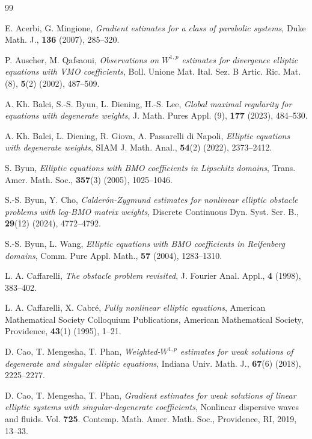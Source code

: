 \documentclass[a4paper, 11pt]{article}
\begin{document}
\begin{thebibliography}{99}

\footnotesize

  E. Acerbi, G. Mingione, {\em Gradient estimates for a class of parabolic systems}, Duke Math. J., {\bf 136} (2007), 285--320.

 P. Auscher, M. Qafsaoui, {\em Observations on $W^{1,p}$ estimates for divergence elliptic equations with VMO coefficients}, Boll. Unione Mat. Ital. Sez. B Artic. Ric. Mat. (8), {\bf 5}(2) (2002), 487--509.

 A. Kh. Balci, S.-S. Byun, L. Diening, H.-S. Lee, {\em Global maximal regularity for equations with degenerate weights}, J. Math. Pures Appl. (9), {\bf 177} (2023), 484--530.

  A. Kh. Balci, L. Diening, R. Giova, A. Passarelli di Napoli, {\em Elliptic equations with degenerate weights}, SIAM J. Math. Anal., {\bf 54}(2) (2022), 2373--2412.

 S. Byun, {\em Elliptic equations with BMO coefficients in Lipschitz domains}, Trans. Amer. Math. Soc., {\bf 357}(3) (2005), 1025--1046.

 S.-S. Byun, Y. Cho, {\em Calder\'on-Zygmund estimates for nonlinear elliptic obstacle problems with log-BMO matrix weights}, Discrete Continuous Dyn. Syst. Ser. B., {\bf 29}(12) (2024), 4772--4792.

 S.-S. Byun, L. Wang, {\em Elliptic equations with BMO coefficients in Reifenberg domains}, Comm. Pure Appl. Math., {\bf 57} (2004), 1283--1310.

 L. A. Caffarelli, {\em The obstacle problem revisited}, J. Fourier Anal. Appl., {\bf 4} (1998), 383--402.

 L. A. Caffarelli, X. Cabr\'e, {\it Fully nonlinear elliptic equations},  American Mathematical Society Colloquium Publications, American Mathematical Society, Providence, {\bf 43}(1) (1995), 1--21.

 D. Cao, T. Mengesha, T. Phan, {\em  Weighted-$W^{1,p}$ estimates for weak solutions of degenerate and singular elliptic equations},  Indiana Univ. Math. J., {\bf 67}(6) (2018), 2225--2277.

 D. Cao, T. Mengesha, T. Phan, {\em Gradient estimates for weak solutions of linear elliptic systems with singular-degenerate coefficients}, Nonlinear dispersive waves and fluids. Vol. {\bf 725}. Contemp. Math. Amer. Math. Soc., Providence, RI, 2019, 13--33.


\end{thebibliography}
\end{document}
